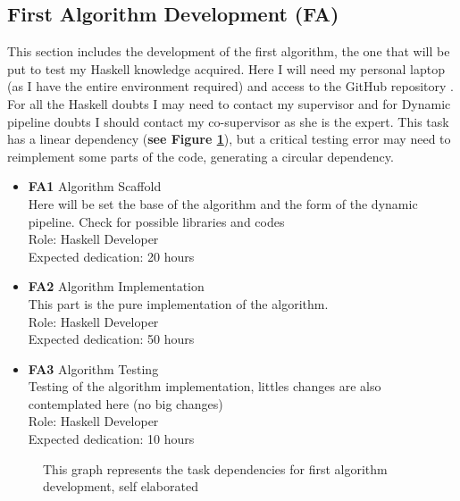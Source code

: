 \subsection{First Algorithm Development \textbf{(FA)}}
This section includes the development of the first algorithm, the one that will be put to test my Haskell knowledge acquired.
Here I will need my personal laptop (as I have the entire environment required) and access to the GitHub repository \cite{forner_gomez_source_nodate}.
For all the Haskell doubts I may need to contact my supervisor and for Dynamic pipeline doubts I should contact my co-supervisor as she is the expert.
This task has a linear dependency (\textbf{see Figure \ref{FA_dependences}}), but a critical testing error may need to reimplement some parts of the code, generating a circular dependency.
\begin{itemize}
    \item \textbf{FA1} Algorithm Scaffold \\
        Here will be set the base of the algorithm and the form of the dynamic pipeline.
        Check for possible libraries and codes \\
        Role: Haskell Developer\\
        Expected dedication: 20 hours
    \item \textbf{FA2} Algorithm Implementation\\
        This part is the pure implementation of the algorithm. \\
        Role: Haskell Developer \\
        Expected dedication: 50 hours
    \item \textbf{FA3} Algorithm Testing \\
        Testing of the algorithm implementation, littles changes are also contemplated here (no big changes) \\
        Role: Haskell Developer \\
        Expected dedication: 10 hours 
\end{itemize}
\begin{figure}[h]
    \centering
    \caption[{[Pla] TD for first algorithm development}]{This graph represents the task dependencies for first algorithm development, self elaborated}
    \label{FA_dependences}
\end{figure}

